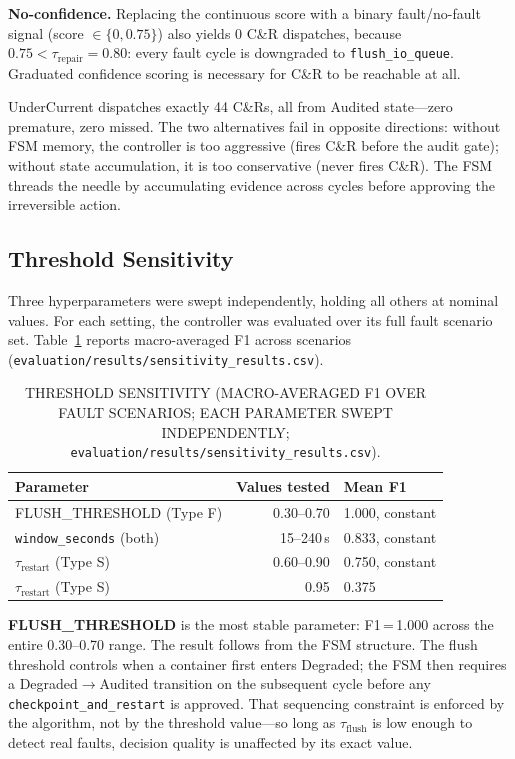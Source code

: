 \documentclass[conference]{IEEEtran}
\begin{document}
\textbf{No-confidence.} Replacing the continuous score with a binary fault/no-fault signal (score $\in \{0, 0.75\}$) also yields 0 C\&R dispatches, because $0.75 < \tau_{\mathrm{repair}} = 0.80$: every fault cycle is downgraded to \texttt{flush\_io\_queue}. Graduated confidence scoring is necessary for C\&R to be reachable at all.

UnderCurrent dispatches exactly 44 C\&Rs, all from Audited state---zero premature, zero missed. The two alternatives fail in opposite directions: without FSM memory, the controller is too aggressive (fires C\&R before the audit gate); without state accumulation, it is too conservative (never fires C\&R). The FSM threads the needle by accumulating evidence across cycles before approving the irreversible action.

\subsection{Threshold Sensitivity}
\label{sec:sensitivity}

Three hyperparameters were swept independently, holding all others at nominal values. For each setting, the controller was evaluated over its full fault scenario set. Table~\ref{tab:sensitivity} reports macro-averaged F1 across scenarios (\texttt{evaluation/results/sensitivity\_results.csv}).

\begin{table}[t]
\caption{THRESHOLD SENSITIVITY (MACRO-AVERAGED F1 OVER FAULT SCENARIOS; EACH PARAMETER SWEPT INDEPENDENTLY; \texttt{evaluation/results/sensitivity\_results.csv}).}
\label{tab:sensitivity}
\centering
\renewcommand{\arraystretch}{1.15}
\begin{tabular}{lrl}
\hline
\textbf{Parameter} & \textbf{Values tested} & \textbf{Mean F1} \\
\hline
FLUSH\_THRESHOLD (Type F) & 0.30--0.70 & 1.000, constant \\
\texttt{window\_seconds} (both)    & 15--240\,s & 0.833, constant \\
$\tau_{\mathrm{restart}}$ (Type S) & 0.60--0.90 & 0.750, constant \\
$\tau_{\mathrm{restart}}$ (Type S) & 0.95       & 0.375 \\
\hline
\end{tabular}
\end{table}

\textbf{FLUSH\_THRESHOLD} is the most stable parameter: F1\,=\,1.000 across the entire 0.30--0.70 range. The result follows from the FSM structure. The flush threshold controls when a container first enters Degraded; the FSM then requires a Degraded$\rightarrow$Audited transition on the subsequent cycle before any \texttt{checkpoint\_and\_restart} is approved. That sequencing constraint is enforced by the algorithm, not by the threshold value---so long as $\tau_{\mathrm{flush}}$ is low enough to detect real faults, decision quality is unaffected by its exact value.
\end{document}
